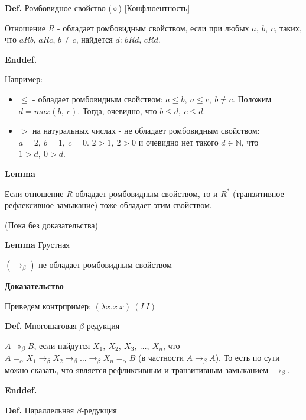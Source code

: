 \documentclass[12pt]{extreport}
\begin{document}
\noindent\textbf{Def.} Ромбовидное свойство ($\diamond$) [Конфлюентность]
    
    Отношение $R$ - обладает ромбовидным свойством, если при любых $a,\ b,\ c$, таких, что $aRb$, $aRc$, $b \not= c$, найдется $d$: $bRd$, $cRd$.
    
\noindent\textbf{Enddef.}

Например:
\begin{itemize}[leftmargin=2cm]
    \item $\leq$ - обладает ромбовидным свойством: $a \leq b,\ a \leq c,\ b \not = c$. Положим $d = max(b,\ c)$. Тогда, очевидно, что $b \leq d,\ c \leq d$.
    \item $>$ на натуральных числах - не обладает ромбовидным свойством: $a = 2,\ b = 1,\ c = 0$. $2 > 1,\ 2 > 0$ и очевидно нет такого $d \in \mathbb{N}$, что $1 > d,\ 0 > d$.
\end{itemize}

\noindent\textbf{Lemma} 

    Если отношение $R$ обладает ромбовидным свойством, то и $R^*$ (транзитивное рефлексивное замыкание) тоже обладает этим свойством.
    
    (Пока без доказательства)
    
\vspace{5mm}     

\noindent\textbf{Lemma} Грустная 

    $(\rightarrow_\beta)$ не обладает ромбовидным свойством
    
    \textbf{Доказательство}
    \begin{addmargin}[3em]{3cm}
    
    Приведем контрпример: $(\lambda x. x\ x)\ (I\ I)$
    
    \end{addmargin}
\vspace{5mm}     
    
    
\noindent\textbf{Def.} Многошаговая $\beta$-редукция
    
    $A \twoheadrightarrow_\beta B$, если найдутся $X_1,\ X_2,\ X_3,\ \dots,\ X_n$, что $A =_\alpha X_1 \rightarrow_\beta X_2 \rightarrow_\beta \dots \rightarrow_\beta X_n =_\alpha B$ (в частности $A \rightarrow_\beta A$). То есть по сути можно сказать, что является рефликсивным и транзитивным замыканием $\rightarrow_\beta$.
    
\noindent\textbf{Enddef.}

\noindent\textbf{Def.} Параллельная $\beta$-редукция
    
\end{document}
